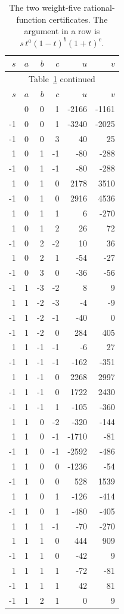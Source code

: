 \begingroup
\small
\setlength{\tabcolsep}{9pt}
\begin{longtable}{rrrrrr}
\caption{The two weight-five rational-function certificates.  The
argument in a row is $s\,t^a(1-t)^b(1+t)^c$.}
\label{gold:tab:certificates}\\
\hline
$s$&$a$&$b$&$c$&$u$&$v$\\ \hline
\endfirsthead
\multicolumn{6}{c}{Table~\ref{gold:tab:certificates} continued}\\
\hline $s$&$a$&$b$&$c$&$u$&$v$\\ \hline
\endhead
\hline
\endfoot
1&0&0&1&-2166&-1161\\
-1&0&0&1&-3240&-2025\\
-1&0&0&3&40&25\\
1&0&1&-1&-80&-288\\
-1&0&1&-1&-80&-288\\
1&0&1&0&2178&3510\\
-1&0&1&0&2916&4536\\
1&0&1&1&6&-270\\
1&0&1&2&26&72\\
-1&0&2&-2&10&36\\
1&0&2&1&-54&-27\\
-1&0&3&0&-36&-56\\
-1&1&-3&-2&8&9\\
1&1&-2&-3&-4&-9\\
-1&1&-2&-1&-40&0\\
-1&1&-2&0&284&405\\
1&1&-1&-1&-6&27\\
-1&1&-1&-1&-162&-351\\
1&1&-1&0&2268&2997\\
-1&1&-1&0&1722&2430\\
-1&1&-1&1&-105&-360\\
1&1&0&-2&-320&-144\\
1&1&0&-1&-1710&-81\\
-1&1&0&-1&-2592&-486\\
1&1&0&0&-1236&-54\\
-1&1&0&0&528&1539\\
1&1&0&1&-126&-414\\
-1&1&0&1&-480&-405\\
1&1&1&-1&-70&-270\\
1&1&1&0&444&909\\
-1&1&1&0&-42&9\\
1&1&1&1&-72&-81\\
-1&1&1&1&42&81\\
-1&1&2&1&0&9\\

\end{longtable}
